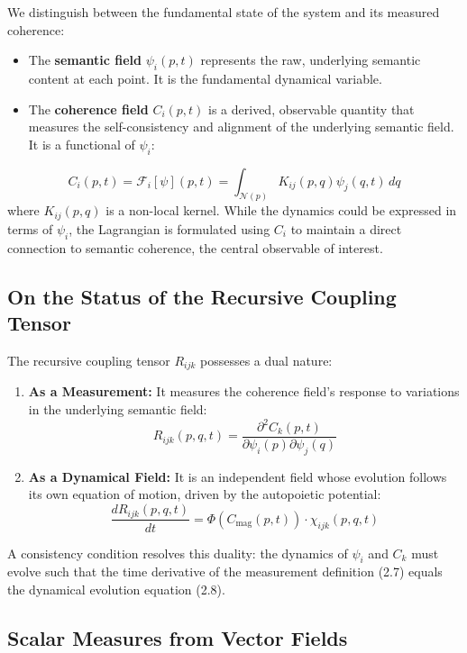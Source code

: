 We distinguish between the fundamental state of the system and its measured coherence:
\begin{itemize}
    \item The \textbf{semantic field} \(\psi_i(p,t)\) represents the raw, underlying semantic content at each point. It is the fundamental dynamical variable.
    \item The \textbf{coherence field} \(C_i(p,t)\) is a derived, observable quantity that measures the self-consistency and alignment of the underlying semantic field. It is a functional of \(\psi_i\):
\end{itemize}
\begin{equation}
C_i(p,t) = \mathcal{F}_i[\psi](p,t) = \int_{\mathcal{N}(p)} K_{ij}(p,q) \psi_j(q,t) \, dq
\end{equation}
where \(K_{ij}(p,q)\) is a non-local kernel. While the dynamics could be expressed in terms of \(\psi_i\), the Lagrangian is formulated using \(C_i\) to maintain a direct connection to semantic coherence, the central observable of interest.

\subsection{On the Status of the Recursive Coupling Tensor}

The recursive coupling tensor \(R_{ijk}\) possesses a dual nature:
\begin{enumerate}
    \item \textbf{As a Measurement:} It measures the coherence field's response to variations in the underlying semantic field:
    \begin{equation}
    R_{ijk}(p, q, t) = \frac{\partial^2 C_k(p,t)}{\partial \psi_i(p) \partial \psi_j(q)}
    \end{equation}
    \item \textbf{As a Dynamical Field:} It is an independent field whose evolution follows its own equation of motion, driven by the autopoietic potential:
    \begin{equation}
    \frac{dR_{ijk}(p,q,t)}{dt} = \Phi(C_{\mathrm{mag}}(p,t)) \cdot \chi_{ijk}(p,q,t)
    \end{equation}
\end{enumerate}
A consistency condition resolves this duality: the dynamics of \(\psi_i\) and \(C_k\) must evolve such that the time derivative of the measurement definition (2.7) equals the dynamical evolution equation (2.8).

\subsection{Scalar Measures from Vector Fields}

